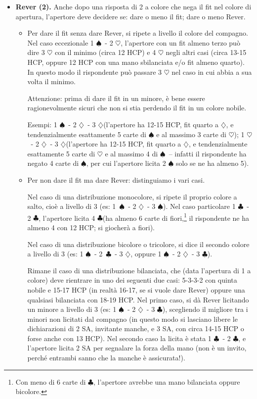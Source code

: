 \documentclass[a4paper,10pt]{article}
\renewcommand{\c}{$\clubsuit$\xspace}
\renewcommand{\d}{$\diamondsuit$\xspace}
\newcommand{\h}{$\heartsuit$\xspace}
\newcommand{\s}{$\spadesuit$\xspace}
\newcommand{\sa}{SA\xspace}
\begin{document}
\begin{itemize}
 Altro esempio: se l'apertore ha meno di 16 HCP, 6 carte di \h e 5 carte di \s, su 1 \h\ - 1 \sa deve rispondere 2 \h e non 2 \s. Questo è un po' triste, però non ci si può fare nulla.
 
 Ulteriore esempio: su 1 \d\ - 1 \s, con la distribuzione 4\d\ - 4\h\ - 3\s\ - 2\c e meno di 16 HCP, l'apertore licita 1 \sa e non 2 \h.
 
 \item {\bf Rever (2).} Anche dopo una risposta di 2 a colore che nega il fit nel colore di apertura, l'apertore deve decidere se: dare o meno il fit; dare o meno Rever.
 \begin{itemize}
  \item Per dare il fit senza dare Rever, si ripete a livello il colore del compagno. Nel caso eccezionale 1 \s\ - 2 \h, l'apertore con un fit almeno terzo può dire 3 \h con il minimo (circa 12 HCP) e 4 \h negli altri casi (circa 13-15 HCP, oppure 12 HCP con una mano sbilanciata e/o fit almeno quarto). In questo modo il rispondente può passare 3 \h nel caso in cui abbia a sua volta il minimo.
  
  Attenzione: prima di dare il fit in un minore, è bene essere ragionevolmente sicuri che non si stia perdendo il fit in un colore nobile.
  
  Esempi: 1 \s\ - 2 \d\ - 3 \d (l'apertore ha 12-15 HCP, fit quarto a \d, e tendenzialmente esattamente 5 carte di \s e al massimo 3 carte di \h);
  1 \h\ - 2 \d\ - 3 \d (l'apertore ha 12-15 HCP, fit quarto a \d, e tendenzialmente esattamente 5 carte di \h e al massimo 4 di \s\ -- infatti il rispondente ha negato 4 carte di \s, per cui l'apertore licita 2 \s solo se ne ha almeno 5).
  
  \item Per non dare il fit ma dare Rever: distinguiamo i vari casi.
  
  Nel caso di una distribuzione monocolore, si ripete il proprio colore a salto, cioè a livello di 3 (es: \mbox{1 \s}\ - 2 \d\ - 3 \s). Nel caso particolare 1 \c\ - 2 \c, l'apertore licita 4 \c (ha almeno 6 carte di fiori,\footnote{Con meno di 6 carte di \c, l'apertore avrebbe una mano bilanciata oppure bicolore.} il rispondente ne ha almeno 4 con 12 HCP; si giocherà a fiori).
  
  Nel caso di una distribuzione bicolore o tricolore, si dice il secondo colore a livello di 3 (es: 1 \s\ - \mbox{2 \c}\ - 3 \d, oppure 1 \s\ - 2 \d\ - 3 \c).
  
  Rimane il caso di una distribuzione bilanciata, che (data l'apertura di 1 a colore) deve rientrare in uno dei seguenti due casi: 5-3-3-2 con quinta nobile e 15-17 HCP (in realtà 16-17, se si vuole dare Rever) oppure una qualsiasi bilanciata con 18-19 HCP. Nel primo caso, si dà Rever licitando un minore a livello di 3 (es: 1 \s\ - 2 \d\ - 3 \c), scegliendo il migliore tra i minori non licitati dal compagno (in questo modo si lasciano libere le dichiarazioni di 2 \sa, invitante manche, e 3 \sa, con circa 14-15 HCP o forse anche con 13 HCP).
  Nel secondo caso la licita è stata 1 \c\ - 2 \c, e l'apertore licita 2 \sa per segnalare la forza della mano (non è un invito, perché entrambi sanno che la manche è assicurata!).
  

\end{itemize}
\end{itemize}
\end{document}
